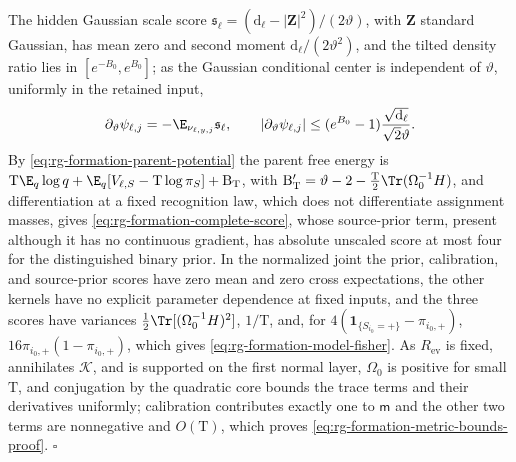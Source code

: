 The hidden Gaussian scale score
\(\mathfrak s_\ell=(\mathrm d_\ell-|\mathbf Z|^2)/(2\vartheta)\), with
\(\mathbf Z\) standard Gaussian, has mean zero and second moment
\(\mathrm d_\ell/(2\vartheta^2)\), and the tilted density ratio lies in
\([e^{-B_0},e^{B_0}]\); as the Gaussian conditional center is independent of
\(\vartheta\), uniformly in the retained input,
\begin{equation}
 \partial_\vartheta\psi_{\ell,j}=-\E_{\nu_{\ell,y,j}}\mathfrak s_\ell,\qquad
 |\partial_\vartheta\psi_{\ell,j}|
 \le(e^{B_0}-1)\frac{\sqrt{\mathrm d_\ell}}{\sqrt2 \vartheta}.
 \label{eq:rg-formation-tilt-score-proof}
\end{equation}
By \cref{eq:rg-formation-parent-potential} the parent free energy is
\(\mathrm T\E_q\log q+\E_q[V_{\ell,S}-\mathrm T\log\pi_S]+\mathrm B_{\mathrm T}\),
with \(\mathrm B_{\mathrm T}'=\vartheta-2-\tfrac{\mathrm T}2\Tr(\Omega_0^{-1}H)\),
and differentiation at a fixed recognition law, which does not differentiate
assignment masses, gives \cref{eq:rg-formation-complete-score}, whose source-prior term, present
although it has no continuous gradient, has absolute unscaled score at most
four for the distinguished binary prior. In the normalized joint the prior, calibration, and source-prior
scores have zero mean and zero cross expectations, the other kernels have no
explicit parameter dependence at fixed inputs, and the three scores have
variances \(\tfrac12\Tr[(\Omega_0^{-1}H)^2]\), \(1/\mathrm T\), and, for
\(4(\mathbf 1_{\{S_{i_0}=+\}}-\pi_{i_0,+})\), \(16\pi_{i_0,+}(1-\pi_{i_0,+})\),
which gives \cref{eq:rg-formation-model-fisher}. As \(R_{\mathrm{ev}}\) is
fixed, annihilates \(\mathcal K\), and is supported on the first normal layer,
\(\Omega_0\) is positive for small \(\mathrm T\), and conjugation by the
quadratic core bounds the trace terms and their derivatives uniformly;
calibration contributes exactly one to \(\mathsf m\) and the other two terms
are nonnegative and \(O(\mathrm T)\), which proves
\cref{eq:rg-formation-metric-bounds-proof}. \hfill\(\square\)

